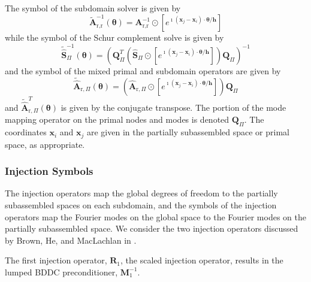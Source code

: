 \documentclass[review]{siamart190516}
\begin{document}
\begin{definition}
The symbol of the subdomain solver is given by
\begin{equation}
\tilde{\mathbf{A}}_{\text{r}, \text{r}}^{-1} \left( \boldsymbol{\theta} \right) = \mathbf{A}_{\text{r}, \text{r}}^{-1} \odot \left[ e^{\imath \left( \mathbf{x}_j - \mathbf{x}_i \right) \cdot \boldsymbol{\theta} / \mathbf{h}} \right]
\end{equation}
while the symbol of the Schur complement solve is given by
\begin{equation}
\tilde{\hat{\mathbf{S}}}_{\Pi}^{-1} \left( \boldsymbol{\theta} \right) = \left( \mathbf{Q}_{\Pi}^T \left( \hat{\mathbf{S}}_{\Pi} \odot \left[ e^{\imath \left( \mathbf{x}_j - \mathbf{x}_i \right) \cdot \boldsymbol{\theta} / \mathbf{h}} \right] \right) \mathbf{Q}_{\Pi} \right)^{-1}
\end{equation}
and the symbol of the mixed primal and subdomain operators are given by
\begin{equation}
\tilde{\hat{\mathbf{A}}}_{\text{r}, \Pi} \left( \boldsymbol{\theta} \right) = \left( \hat{\mathbf{A}}_{\text{r}, \Pi} \odot \left[ e^{\imath \left( \mathbf{x}_j - \mathbf{x}_i \right) \cdot \boldsymbol{\theta} / \mathbf{h}} \right] \right) \mathbf{Q}_{\Pi}
\end{equation}
and $\tilde{\hat{\mathbf{A}}}_{\text{r}, \Pi}^T \left( \boldsymbol{\theta} \right)$ is given by the conjugate transpose.
The portion of the mode mapping operator on the primal nodes and modes is denoted $\mathbf{Q}_{\Pi}$.
The coordinates $\mathbf{x}_i$ and $\mathbf{x}_j$ are given in the partially subassembled space or primal space, as appropriate.
\label{def:subassembled_symbol}
\end{definition}

\subsubsection{Injection Symbols}\label{sec:lfainjection}

The injection operators map the global degrees of freedom to the partially subassembled spaces on each subdomain, and the symbols of the injection operators map the Fourier modes on the global space to the Fourier modes on the partially subassembled space.
We consider the two injection operators discussed by Brown, He, and MacLachlan in \cite{brown2019local}.

The first injection operator, $\mathbf{R}_1$, the scaled injection operator, results in the lumped BDDC preconditioner, $\mathbf{M}^{-1}_1$.
\end{document}
